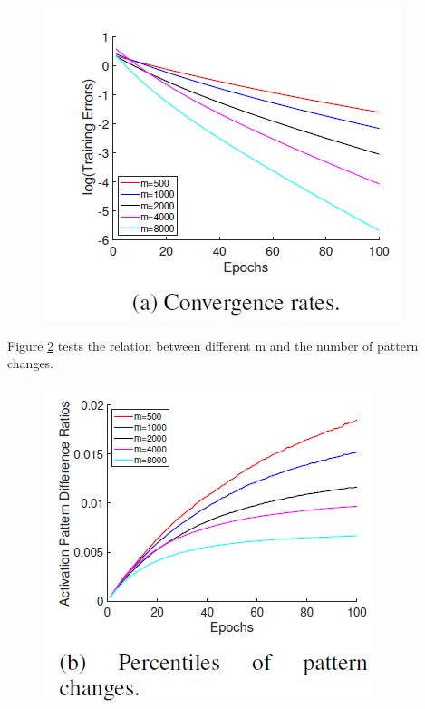 \documentclass{article}
\begin{document}
\begin{figure}[h]
	\centering
    \includegraphics[scale= 0.5]{pics/overparameterization/ConvergeRate.PNG}
	\label{fig:convergerate}
\end{figure}

Figure \ref{fig:patternsample} tests the relation between different m and the number of pattern changes.
\begin{figure}[h]
	\centering
    \includegraphics[scale= 0.5]{pics/overparameterization/PatternSample.PNG}
	\label{fig:patternsample}
\end{figure}
\end{document}
